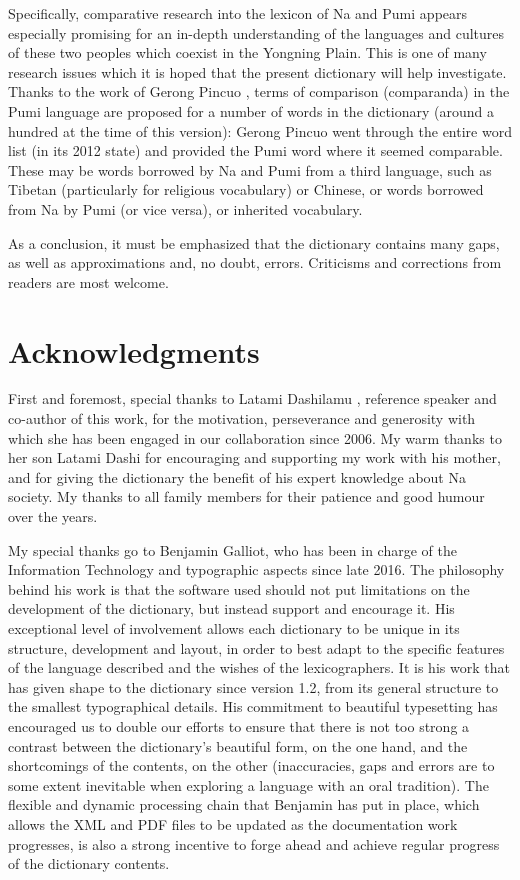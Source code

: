 Specifically, comparative research into the lexicon of Na and Pumi \parencite{daudey2014} appears especially promising for an in-depth understanding of the languages and cultures of these two peoples which coexist in the Yongning Plain. This is one of many research issues which it is hoped that the present dictionary will help investigate. Thanks to the work of Gerong Pincuo , terms of comparison (comparanda) in the Pumi language are proposed for a number of words in the dictionary (around a hundred at the time of this version): Gerong Pincuo went through the entire word list (in its 2012 state) and provided the Pumi word where it seemed comparable. These may be words borrowed by Na and Pumi from a third language, such as Tibetan (particularly for religious vocabulary) or Chinese, or words borrowed from Na by Pumi (or vice versa), or inherited vocabulary.

As a conclusion, it must be emphasized that the dictionary contains many gaps, as well as approximations and, no doubt, errors. Criticisms and corrections from readers are most welcome.

\section*{Acknowledgments}

First and foremost, special thanks to Latami Dashilamu , reference speaker and co-author of this work, for the motivation, perseverance and generosity with which she has been engaged in our collaboration since 2006. My warm thanks to her son Latami Dashi  for encouraging and supporting my work with his mother, and for giving the dictionary the benefit of his expert knowledge about Na society. My thanks to all family members for their patience and good humour over the years.

My special thanks go to Benjamin Galliot, who has been in charge of the Information Technology and typographic aspects since late 2016. The philosophy behind his work is that the software used should not put limitations on the development of the dictionary, but instead support and encourage it. His exceptional level of involvement allows each dictionary to be unique in its structure, development and layout, in order to best adapt to the specific features of the language described and the wishes of the lexicographers. It is his work that has given shape to the dictionary since version 1.2, from its general structure to the smallest typographical details. His commitment to beautiful typesetting has encouraged us to double our efforts to ensure that there is not too strong a contrast between the dictionary's beautiful form, on the one hand, and the shortcomings of the contents, on the other (inaccuracies, gaps and errors are to some extent inevitable when exploring a language with an oral tradition). The flexible and dynamic processing chain that Benjamin has put in place, which allows the XML and PDF files to be updated as the documentation work progresses, is also a strong incentive to forge ahead and achieve regular progress of the dictionary contents.


